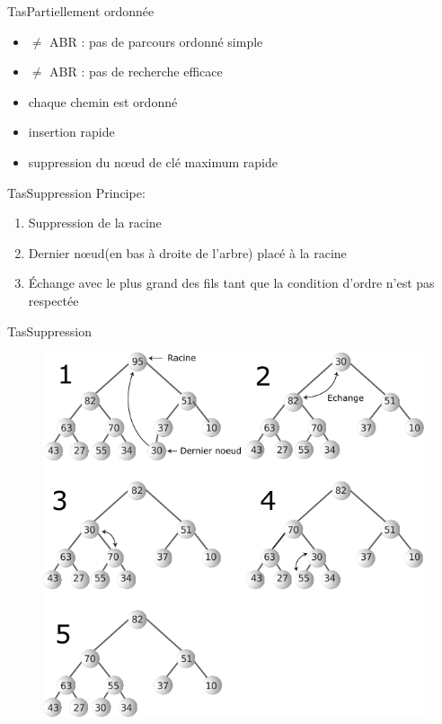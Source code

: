 \documentclass[12pt,a4paper]{beamer}
\newcommand{\hl}[1]{\textcolor{blueemph}{#1}}
\begin{document}
\begin{frame}{Tas}{Partiellement ordonnée}
\begin{itemize}
\item $\neq$ ABR : pas de parcours ordonné simple
\item $\neq$ ABR : pas de recherche efficace
\item chaque chemin est ordonné
\item insertion rapide
\item suppression du n\oe ud de clé maximum rapide 
\end{itemize}

\end{frame}

\begin{frame}{Tas}{Suppression}
\hl{Principe}: 
\begin{enumerate}
\item Suppression de la racine
\item Dernier n\oe ud(en bas à droite de l'arbre) placé à la racine
\item Échange avec le plus grand des fils tant que la condition d'ordre n'est pas respectée
\end{enumerate}
\end{frame}

\begin{frame}{Tas}{Suppression}
\begin{figure}
\includegraphics[scale=0.7]{figs/heap_remove}
\end{figure}
\end{frame}
\end{document}
